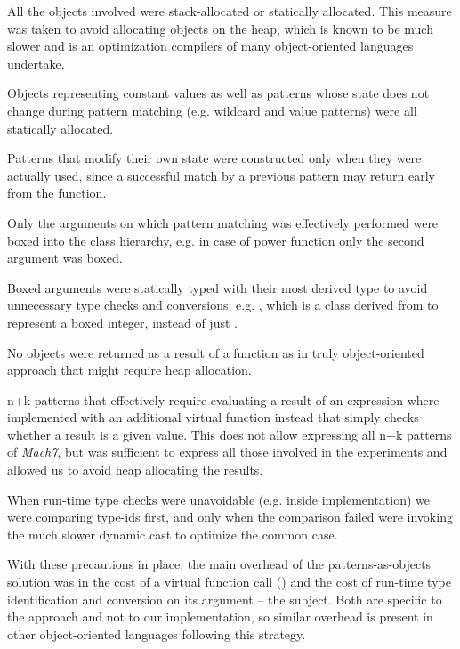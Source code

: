 \begin{compactitem}
\setlength{\itemsep}{0pt}
\setlength{\parskip}{0pt}
\item All the objects involved were stack-allocated or statically allocated. 
      This measure was taken to avoid allocating objects on the heap, which is 
      known to be much slower and is an optimization compilers of many 
      object-oriented languages undertake.
\item Objects representing constant values as well as patterns whose state 
      does not change during pattern matching (e.g. wildcard and value patterns) 
      were all statically allocated.
\item Patterns that modify their own state were constructed only when they were 
      actually used, since a successful match by a previous pattern may return 
      early from the function.
\item Only the arguments on which pattern matching was effectively performed 
      were boxed into the  class hierarchy, e.g. in case of power 
      function only the second argument was boxed.
\item Boxed arguments were statically typed with their most derived type to 
      avoid unnecessary type checks and conversions: e.g. , 
      which is a class derived from  to represent a boxed integer, 
      instead of just .
\item No objects were returned as a result of a function as in truly 
      object-oriented approach that might require heap allocation.
\item n+k patterns that effectively require evaluating a result of an expression 
      where implemented with an additional virtual function instead that simply
      checks whether a result is a given value. This does not allow expressing
      all n+k patterns of \emph{Mach7}, but was sufficient to express all those 
      involved in the experiments and allowed us to avoid heap allocating the 
      results. 
\item When run-time type checks were unavoidable (e.g. inside  
      implementation) we were comparing type-ids first, and only when the 
      comparison failed were invoking the much slower dynamic cast to optimize 
      the common case.
\end{compactitem}

\noindent
With these precautions in place, the main overhead of the 
patterns-as-objects solution was in the cost of a virtual 
function call () and the cost of run-time type 
identification and conversion on its argument -- the subject. Both are specific 
to the approach and not to our implementation, so similar overhead is present in 
other object-oriented languages following this strategy.

